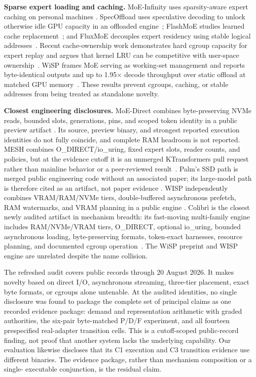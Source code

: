 \documentclass[letterpaper,twocolumn,10pt]{article}
\newcommand{\para}[1]{\smallskip\noindent\textbf{#1.}}
\begin{document}
\para{Sparse expert loading and caching}
MoE-Infinity uses sparsity-aware expert caching on personal machines
\cite{moeinfinity}.  SpecOffload uses speculative decoding to unlock otherwise
idle GPU capacity in an offloaded engine~\cite{specoffload}; FlashMoE studies
learned cache replacement~\cite{flashmoe}; and FluxMoE decouples expert
residency using stable logical addresses~\cite{fluxmoe}.  Recent cache-ownership
work demonstrates hard cgroup capacity for expert replay and argues that kernel
LRU can be competitive with user-space ownership~\cite{expertcacheownership}.
WiSP frames MoE serving as working-set management and reports byte-identical
outputs and up to 1.95$\times$ decode throughput over static offload at matched
GPU memory~\cite{wisppaper}.
These results prevent cgroups, caching, or stable addresses from being treated
as standalone novelty.

\para{Closest engineering disclosures}
MoE-Direct combines byte-preserving NVMe reads, bounded slots, generations,
pins, and scoped token identity in a public preview artifact
\cite{moedirect}.  Its source, preview binary, and strongest reported execution
identities do not fully coincide, and complete RAM headroom is not reported.
MESH combines O\_DIRECT/io\_uring, fixed expert slots, reader counts, and
policies, but at the evidence cutoff it is an unmerged KTransformers pull
request rather than mainline behavior or a peer-reviewed result~\cite{mesh}.
Palm's SSD path is merged public engineering code without an associated paper;
its large-model path is therefore cited as an artifact, not paper evidence
\cite{palm}.  WISP independently combines VRAM/RAM/NVMe tiers, double-buffered
asynchronous prefetch, RAM watermarks, and VRAM planning in a public engine
\cite{wispengine}.  Colibr\`i is the closest newly audited artifact in mechanism
breadth: its fast-moving multi-family engine includes RAM/NVMe/VRAM tiers,
O\_DIRECT, optional io\_uring, bounded asynchronous loading, byte-preserving
formats, token-exact harnesses, resource planning, and documented cgroup
operation~\cite{colibri}.  The WiSP preprint and WISP engine are unrelated
despite the name collision.

The refreshed audit covers public records through 20 August 2026.  It makes
novelty based on direct I/O, asynchronous streaming, three-tier placement,
exact byte formats, or cgroups alone untenable.  At the audited identities, no
single disclosure was found to package the complete set of principal claims as
one recorded evidence package: demand and representation arithmetic with graded authorities,
the six-pair byte-matched P/D/F experiment, and all fourteen prespecified
real-adapter transition cells.  This is a cutoff-scoped public-record finding,
not proof that another system lacks the underlying capability.  Our evaluation likewise
discloses that its C1 execution and C3 transition evidence use different
binaries.  The evidence package, rather than mechanism composition or a single-
executable conjunction, is the residual claim.
\end{document}
